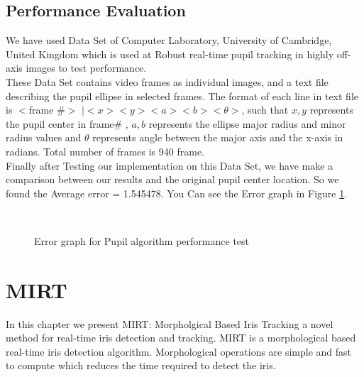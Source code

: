 \documentclass[12pt,fleqn]{book} %
\begin{document}
\section{Performance Evaluation} 
	We have used Data Set of Computer Laboratory, University of Cambridge, United Kingdom which is used at Robust real-time pupil tracking in highly off-axis images to test performance. \cite{swirski} \\
	These Data Set contains video frames as individual images, and a text file describing the pupil ellipse in selected frames. The format of each line in text file is $<$frame \#$>$ $| <x> <y> <a> <b> < \theta >$, such that $ x , y$ represents the pupil center in frame\# , $ a, b$ represents the ellipse major radius and minor radius  values and $\theta$ represents angle between the major axis and the x-axis in radians. Total number of frames is 940 frame. \\
	Finally after Testing our implementation on this Data Set, we have make a comparison between our results and the original pupil center location. So we found the Average error = 1.545478. You Can see the 	Error graph in Figure \ref{fig:ErrorGraph}.
		

\begin{figure}[]
\begin{dBox}
\centering
  \mbox{
   }
   \caption{Error graph for Pupil algorithm performance test
   \label{fig:ErrorGraph} }   
\end{dBox}   
\end{figure}


\chapter{MIRT}
In this chapter we present MIRT: Morpholgical Based Iris Tracking a novel method for real-time iris detection and tracking. MIRT is a morphological based real-time iris detection algorithm. Morphological operations are simple and fast to compute which reduces the time required to detect the iris. 
\end{document}
